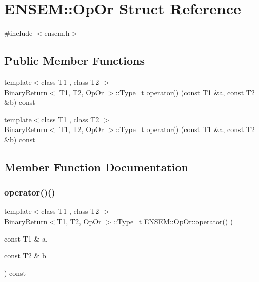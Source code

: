 \hypertarget{structENSEM_1_1OpOr}{}\section{E\+N\+S\+EM\+:\+:Op\+Or Struct Reference}
\label{structENSEM_1_1OpOr}


{\ttfamily \#include $<$ensem.\+h$>$}

\subsection*{Public Member Functions}
\begin{DoxyCompactItemize}
\item 
{\footnotesize template$<$class T1 , class T2 $>$ }\\\mbox{\hyperlink{structENSEM_1_1BinaryReturn}{Binary\+Return}}$<$ T1, T2, \mbox{\hyperlink{structENSEM_1_1OpOr}{Op\+Or}} $>$\+::Type\+\_\+t \mbox{\hyperlink{structENSEM_1_1OpOr_a8b897dcdf1e2210e064a33b281a22fc4}{operator()}} (const T1 \&a, const T2 \&b) const
\item 
{\footnotesize template$<$class T1 , class T2 $>$ }\\\mbox{\hyperlink{structENSEM_1_1BinaryReturn}{Binary\+Return}}$<$ T1, T2, \mbox{\hyperlink{structENSEM_1_1OpOr}{Op\+Or}} $>$\+::Type\+\_\+t \mbox{\hyperlink{structENSEM_1_1OpOr_a8b897dcdf1e2210e064a33b281a22fc4}{operator()}} (const T1 \&a, const T2 \&b) const
\end{DoxyCompactItemize}


\subsection{Member Function Documentation}
\mbox{\label{structENSEM_1_1OpOr_a8b897dcdf1e2210e064a33b281a22fc4}} 
\subsubsection{\texorpdfstring{operator()()}{operator()()}\hspace{0.1cm}{\footnotesize\ttfamily [1/2]}}
{\footnotesize\ttfamily template$<$class T1 , class T2 $>$ \\
\mbox{\hyperlink{structENSEM_1_1BinaryReturn}{Binary\+Return}}$<$T1, T2, \mbox{\hyperlink{structENSEM_1_1OpOr}{Op\+Or}} $>$\+::Type\+\_\+t E\+N\+S\+E\+M\+::\+Op\+Or\+::operator() (\begin{DoxyParamCaption}\item[{const T1 \&}]{a,  }\item[{const T2 \&}]{b }\end{DoxyParamCaption}) const\hspace{0.3cm}{\ttfamily [inline]}}

